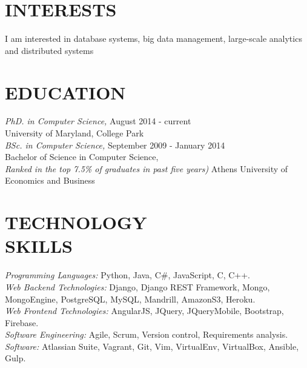 \documentclass[margin, 10pt]{res} %
\begin{document}
\begin{resume}


\section{INTERESTS}

I am interested in database systems, big data management, large-scale analytics and distributed systems


\section{EDUCATION}

{\sl PhD. in Computer Science,}  \hfill August 2014 - current \\
University of Maryland, College Park\\

{\sl BSc. in Computer Science,}  \hfill September 2009 - January 2014 \\
Bachelor of Science in Computer Science,\\
\textit{Ranked in the top 7.5\% of graduates in past five years)}
Athens University of Economics and Business\\


\section{TECHNOLOGY \\ SKILLS}

{\sl Programming Languages:} Python, Java, C\#, JavaScript, C, C++. \\
{\sl Web Backend Technologies:} Django, Django REST Framework, Mongo, MongoEngine, PostgreSQL, MySQL, Mandrill, AmazonS3, Heroku. \\
{\sl Web Frontend Technologies:} AngularJS, JQuery, JQueryMobile, Bootstrap, Firebase. \\
{\sl Software Engineering:} Agile, Scrum, Version control, Requirements analysis. \\
{\sl Software:} Atlassian Suite, Vagrant, Git, Vim, VirtualEnv, VirtualBox, Ansible, Gulp. \\


\end{resume}
\end{document}
